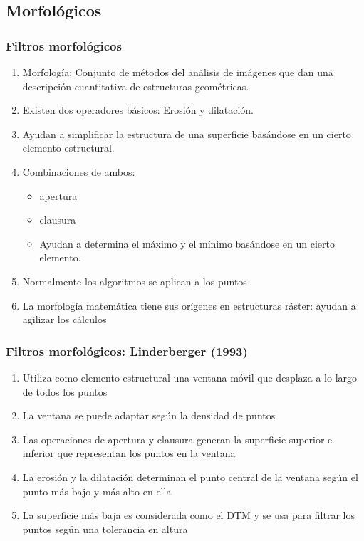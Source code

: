 \subsection{Morfológicos}
\begin{frame}
  \frametitle{Filtros morfológicos}
  \begin{enumerate}
    \item<1-> \alert{Morfología}: Conjunto de métodos del análisis de imágenes que
      dan una descripción cuantitativa de estructuras geométricas.
    \item<2-> Existen dos operadores básicos: \alert{Erosión} y \alert{dilatación}.
    \item<2-> Ayudan a simplificar la estructura de una superficie basándose en un
      cierto elemento estructural.
    \item<3-> Combinaciones de ambos:
      \begin{itemize}
        \item<3-> \alert{apertura}
        \item<3-> \alert{clausura}
        \item<6-> Ayudan a determina el máximo y el mínimo basándose en un cierto elemento.
      \end{itemize}
    \item<7-> Normalmente los algoritmos se aplican a los puntos 
    \item<7-> La morfología matemática tiene sus orígenes en estructuras ráster:
      ayudan a agilizar los cálculos
  \end{enumerate}
\end{frame}
\begin{frame}
  \frametitle{Filtros morfológicos: Linderberger (1993)}
  \begin{enumerate}
    \item Utiliza como elemento estructural una ventana móvil que desplaza 
      a lo largo de todos los puntos
    \item La ventana se puede adaptar según la densidad de puntos
    \item Las operaciones de apertura y clausura generan la superficie superior
      e inferior que representan los puntos en la ventana
    \item La erosión y la dilatación determinan el punto central de la ventana
      según el punto más bajo y más alto en ella
    \item La superficie más baja es considerada como el DTM y se usa para
      filtrar los puntos según una tolerancia en altura
  \end{enumerate}
\end{frame}
